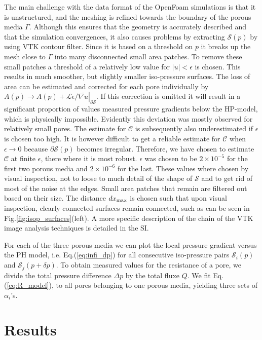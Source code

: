 \documentclass[draft]{agujournal2019}
\begin{document}
The main challenge with the data format of the OpenFoam simulations is that it is unstructured, and the meshing is refined towards the boundary of the porous media $\Gamma$. Although this ensures that the geometry is accurately described and that the simulation convergences, it also causes problems by extracting $\mathcal{S}(p)$ by using VTK contour filter. Since it is based on a threshold on $p$ it breaks up the mesh close to $\Gamma$ into many disconnected small area patches. To remove these small patches a threshold of a relatively low value for $\left|u\right|< \epsilon$ is chosen. This results in much smoother, but slightly smaller iso-pressure surfaces. The loss of area can be estimated and corrected for each pore individually by $A(p)\rightarrow A(p) + \left.\mathcal{L}\epsilon/\overline{\nabla u}\right|_{\partial \mathcal{S}}$. If this correction is omitted it will result in a significant proportion of values measured pressure gradients below the HP-model, which is physically impossible. Evidently this deviation was mostly observed for relatively small pores. The estimate for $\mathcal{C}$ is subsequently also underestimated if $\epsilon$ is chosen too high. It is however difficult to get a reliable estimate for $\mathcal{C}$ when $\epsilon \rightarrow 0$ because $\partial \mathcal{S}(p)$ becomes irregular. Therefore, we have chosen to estimate $\mathcal{C}$  at finite $\epsilon$, there where it is most robust. $\epsilon$ was chosen to be $2\times10^{-5}$ for the first two porous media and $2\times10^{-6}$ for the last. These values where chosen by visual inspection, not to loose to much detail of the shape of $\mathcal{S}$ and to get rid of most of the noise at the edges. Small area patches that remain are filtered out based on their size. The distance $dx_{\rm{max}}$ is chosen such that upon visual inspection, clearly connected surfaces remain connected, such as can be seen in Fig.\ref{fig:isop_surfaces}(left). A more specific description of the chain of the VTK image analysis techniques is detailed in the SI. 

For each of the three porous media we can plot the local pressure gradient versus the PH model, i.e. Eq.(\ref{eq:infi_dp}) for all consecutive iso-pressure pairs $\mathcal{S}_i(p)$ and $\mathcal{S}_j(p+\delta p)$. To obtain measured values for the resistance of a pore, we divide the total pressure difference $\Delta p$ by the total fluxe $Q$. We fit Eq.(\ref{eq:R_model}), to all pores belonging to one porous media, yielding three sets of $\alpha_i$'s.  


\section{Results}
\end{document}
